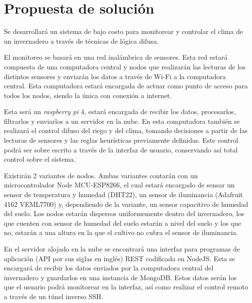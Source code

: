 \section{Propuesta de solución}

Se desarrollará un sistema de bajo costo para monitorear y controlar el clima de un invernadero a través de técnicas de lógica difusa.

El monitoreo se basará en una red inalámbrica de sensores. Esta red estará compuesta de una computadora central y nodos que realizarán las lecturas de los distintos sensores y enviarán los datos a través de Wi-Fi a la computadora central. Esta computadora estará encargada de actuar como punto de acceso para todos los nodos, siendo la única con conexión a internet. 

Esta será un \textit{raspberry pi} 4, estará encargada de recibir los datos, procesarlos, filtrarlos y enviarlos a un servidor en la nube. En esta computadora también se realizará el control difuso del riego y del clima, tomando decisiones a partir de las lecturas de sensores y las reglas heurísticas previamente definidas. Este control podrá ser sobre escrito a través de la interfaz de usuario, conservando así total control sobre el sistema.

Existirán 2 variantes de nodos. Ambas variantes contarán con un microcontrolador Node MCU-ESP8266, el cual estará encargado de sensar un sensor de temperatura y humedad (DHT22), un sensor de iluminancia (Adafruit 4162 VEML7700) y, dependiendo de la variante, un sensor capacitivo de humedad del suelo. Los nodos estarán dispersos uniformemente dentro del invernadero, los que cuenten con sensor de humedad del suelo estarán a nivel del suelo y los que no, estarán a una altura en la que el cultivo no cubra el sensor de iluminancia.

En el servidor alojado en la nube se encontrará una interfaz para programas de aplicación (API por sus siglas en inglés) REST codificada en NodeJS. Esta se encargará de recibir los datos enviados por la computadora central del invernadero y guardarlos en una instancia de MongoDB. Estos datos serán los que el usuario podrá monitorear en la interfaz, así como realizar el control remoto a través de un túnel inverso SSH.
